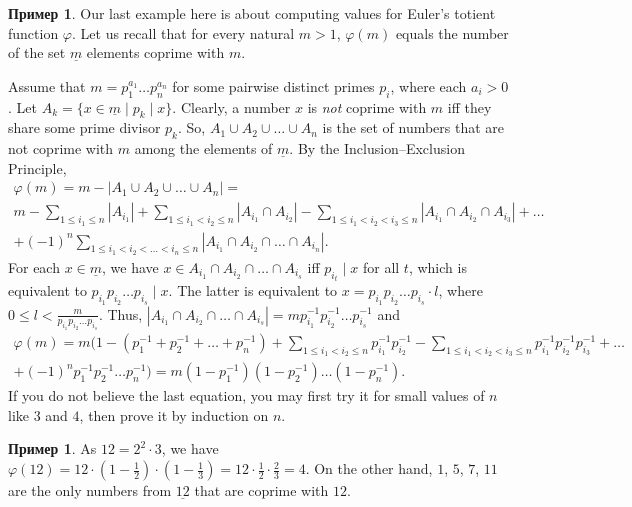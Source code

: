 \documentclass[12pt,notitlepage]{article}
\theoremstyle{plain}
\theoremstyle{definition}
\newtheorem{exm}[thm]{Пример}
\theoremstyle{plain}
\renewcommand{\phi}{\varphi}
\newcommand{\ul}[1]{\underline{#1}}
\newcommand{\1}{\mathbf{1}}
\newcommand{\0}{\mathbf{0}}
\newcommand{\dvd}{\mathop{\mid}}
\begin{document}
\begin{exm}
	Our last example here is about computing values for Euler's totient function $\phi$. Let us recall that for every natural $m > 1$, $\phi(m)$ equals the number of the set $\ul{m}$ elements coprime with $m$.
	
	Assume that $m = p^{a_1}_1\ldots p_n^{a_n}$ for some pairwise distinct primes $p_i$, where each $a_i > 0$. Let $A_k = \{ x \in \ul{m} \mid p_k \dvd x \}$. Clearly, a number $x$ is \emph{not} coprime with $m$ iff they share some prime divisor $p_k$. So, $A_1 \cup A_2 \cup \ldots \cup A_n$ is the set of numbers that are not coprime with $m$ among the elements of $\ul{m}$. By the Inclusion--Exclusion Principle,
	\begin{multline*}
		\phi(m) = m - |A_1 \cup A_2 \cup \ldots \cup A_n| = \\
		m - \sum\limits_{1\leqslant i_1 \leqslant n} |A_{i_1}| + \sum\limits_{1\leqslant i_1 < i_2 \leqslant n} |A_{i_1} \cap A_{i_2}| - \sum\limits_{1\leqslant i_1 < i_2 < i_3 \leqslant n} |A_{i_1} \cap A_{i_2} \cap A_{i_3}| + \ldots\\
		+ (-1)^{n} \sum\limits_{1\leqslant i_1 < i_2 < \ldots < i_n \leqslant n} |A_{i_1} \cap A_{i_2} \cap \ldots \cap A_{i_n}|.
	\end{multline*}
	For each $x \in \ul{m}$, we have $x \in A_{i_1} \cap A_{i_2} \cap \ldots \cap A_{i_s}$ iff  $p_{i_t} \dvd x$ for all $t$, which is equivalent to $p_{i_1} p_{i_2} \ldots p_{i_s} \dvd x$. The latter is equivalent to $x =  p_{i_1} p_{i_2} \ldots p_{i_s} \cdot l$, where $0 \leq l < \frac{m}{p_{i_1} p_{i_2} \ldots p_{i_s}}$. Thus, $|A_{i_1} \cap A_{i_2} \cap \ldots \cap A_{i_s}| = m p^{-1}_{i_1} p^{-1}_{i_2} \ldots p^{-1}_{i_s}$ and
	\begin{multline*}
		\phi(m) = m \bigl(1  - (p^{-1}_{1} + p^{-1}_2 + \ldots + p^{-1}_n) + \sum\limits_{1\leqslant i_1 < i_2 \leqslant n} p^{-1}_{i_1} p^{-1}_{i_2} - \sum\limits_{1\leqslant i_1 < i_2 < i_3 \leqslant n} p^{-1}_{i_1} p^{-1}_{i_2} p^{-1}_{i_3} + \ldots\\
		+ (-1)^{n}  p^{-1}_{1} p^{-1}_{2} \ldots  p^{-1}_{n} \bigr) = m (1 - p^{-1}_1) (1 - p^{-1}_2) \ldots (1 - p^{-1}_n).
	\end{multline*}
	If you do not believe the last equation, you may first try it for small values of $n$ like $3$ and $4$, then prove it by induction on $n$.
\end{exm}
\begin{exm}
	As $12 = 2^2 \cdot 3$, we have $\phi(12) = 12 \cdot (1 - \frac{1}{2})\cdot (1 - \frac{1}{3}) = 12 \cdot \frac{1}{2} \cdot \frac{2}{3} = 4$. On the other hand, $1$, $5$, $7$, $11$ are the only numbers from $\ul{12}$ that are coprime with $12$.
\end{exm}
\end{document}
